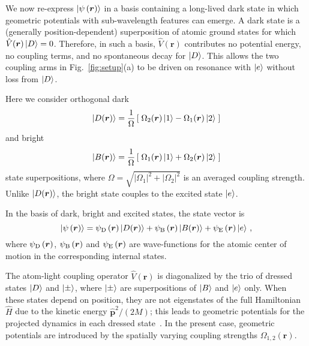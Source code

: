 \documentclass[aps,pra,twocolumn,showpacs,superscriptaddress,floatfix,longbibliography]{revtex4-1}
\def\psid{\psi_{\rm D}}
\def\psib{\psi_{\rm B}}
\def\psie{\psi_{\rm E}}
\begin{document}
We now re-express $\ket{\psi\left(\boldsymbol{r}\right)}$ in a basis containing a long-lived dark state in which geometric potentials with sub-wavelength features can emerge.
A dark state is a (generally position-dependent) superposition of atomic ground states for which $\hat{V}(\boldsymbol{r})\ket{D}=0$.
Therefore, in such a basis, $\hat{V}(\boldsymbol{r})$ contributes no potential energy, no coupling terms, and no spontaneous decay for $\ket{D}$. 
This allows the two coupling arms in Fig.~\ref{fig:setup}(a) to be driven on resonance with $\ket{e}$ without loss from $\ket{D}$.

Here we consider orthogonal dark
\begin{equation}
\ket{D(\boldsymbol{r})} = \frac{1}{\Omega} \left[ \; \Omega_{2}(\boldsymbol{r}) \ket{1}  - \Omega_{1}(\boldsymbol{r}) \ket{2} \; \right]
\label{eq:D}
\end{equation}
and bright
\begin{equation}
\ket{B(\boldsymbol{r})} = \frac{1}{\Omega} \left[ \;  \Omega_{1}(\boldsymbol{r}) \ket{1}  + \Omega_{2}(\boldsymbol{r}) \ket{2} \; \right]
\label{eq:B}
\end{equation}
state superpositions, where $\Omega = \sqrt{ \left| \Omega_{1} \right|^2 + \left| \Omega_{2} \right|^2 }$ is an averaged coupling strength.
Unlike $\ket{D(\boldsymbol{r})}$, the bright state couples to the excited state $\ket{e}$.

In the basis of dark, bright and excited states, the state vector is \begin{equation}
\ket{\psi\left(\boldsymbol{r}\right)} = \psid\left(\boldsymbol{r}\right) \ket{D(\boldsymbol{r})} + \psib\left(\boldsymbol{r}\right) \ket{B(\boldsymbol{r})} + \psie\left(\boldsymbol{r}\right) \ket{e}\,,\label{eq:|psi>-expansion-dark, bright, excited}
\end{equation}
where $\psid\left(\boldsymbol{r}\right)$, $\psib\left(\boldsymbol{r}\right)$
and $\psie\left(\boldsymbol{r}\right)$ are wave-functions for
the atomic center of motion in the corresponding internal states.

The atom-light coupling operator $\hat{V}(\boldsymbol{r})$ is diagonalized by the trio of dressed states $\ket{D}$ and $\ket{\pm}$, where $\ket{\pm}$  are superpositions of $\ket{B}$ and $\ket{e}$ only.
When these states depend on position, they are not eigenstates of the full Hamiltonian $\hat H$ due to the kinetic energy $\hat{\mathbf{p}}^{2} / (2 M)$; this leads to geometric potentials for the projected dynamics in each dressed state~\cite{Goldman2014,Mead1992}.
In the present case, geometric potentials are introduced by the spatially varying coupling strengths $\Omega_{1,2}(\boldsymbol{r})$.
\end{document}
